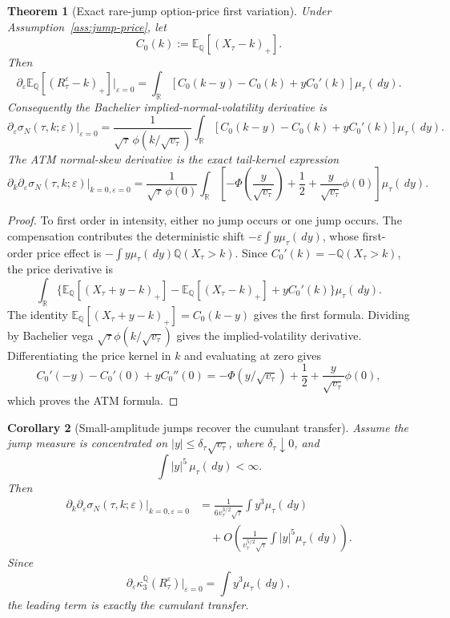 \documentclass[11pt,a4paper]{amsart}
\theoremstyle{plain}
\newtheorem{theorem}{Theorem}[section]
\newtheorem{corollary}[theorem]{Corollary}
\theoremstyle{definition}
\theoremstyle{remark}
\newcommand{\R}{\mathbb{R}}
\newcommand{\QQ}{\mathbb{Q}}
\newcommand{\EE}{\mathbb{E}}
\newcommand{\dd}{\,d}
\begin{document}
\begin{theorem}[Exact rare-jump option-price first variation]\label{thm:exact-jump-price}
Under Assumption~\ref{ass:jump-price}, let
\[
        C_0(k):=\EE_\QQ[(X_\tau-k)_+].
\]
Then
\[
        \partial_\varepsilon\EE_\QQ[(R_\tau^\varepsilon-k)_+]\big|_{\varepsilon=0}
        =
        \int_\R
        \left[
                C_0(k-y)-C_0(k)+yC_0'(k)
        \right]
        \mu_\tau(\dd y).
\]
Consequently the Bachelier implied-normal-volatility derivative is
\[
        \partial_\varepsilon\sigma_N(\tau,k;\varepsilon)\big|_{\varepsilon=0}
        =
        \frac{1}{\sqrt\tau\,\phi(k/\sqrt{v_\tau})}
        \int_\R
        \left[
                C_0(k-y)-C_0(k)+yC_0'(k)
        \right]
        \mu_\tau(\dd y).
\]
The ATM normal-skew derivative is the exact tail-kernel expression
\[
        \partial_k\partial_\varepsilon\sigma_N(\tau,k;\varepsilon)\big|_{k=0,\varepsilon=0}
        =
        \frac{1}{\sqrt\tau\,\phi(0)}
        \int_\R
        \left[
                -\Phi\!\left(\frac{y}{\sqrt{v_\tau}}\right)
                +\frac12
                +\frac{y}{\sqrt{v_\tau}}\phi(0)
        \right]
        \mu_\tau(\dd y).
\]
\end{theorem}

\begin{proof}
To first order in intensity, either no jump occurs or one jump occurs.  The compensation
contributes the deterministic shift \(-\varepsilon\int y\mu_\tau(\dd y)\), whose first-order price
effect is \(-\int y\mu_\tau(\dd y)\QQ(X_\tau>k)\).  Since
\(C_0'(k)=-\QQ(X_\tau>k)\), the price derivative is
\[
        \int_\R
        \{\EE_\QQ[(X_\tau+y-k)_+]-\EE_\QQ[(X_\tau-k)_+]+yC_0'(k)\}
        \mu_\tau(\dd y).
\]
The identity \(\EE_\QQ[(X_\tau+y-k)_+]=C_0(k-y)\) gives the first formula.  Dividing by Bachelier
vega \(\sqrt\tau\phi(k/\sqrt{v_\tau})\) gives the implied-volatility derivative.  Differentiating
the price kernel in \(k\) and evaluating at zero gives
\[
        C_0'(-y)-C_0'(0)+yC_0''(0)
        =
        -\Phi(y/\sqrt{v_\tau})+\frac12+\frac{y}{\sqrt{v_\tau}}\phi(0),
\]
which proves the ATM formula.
\end{proof}

\begin{corollary}[Small-amplitude jumps recover the cumulant transfer]\label{cor:small-jumps-cumulant}
Assume the jump measure is concentrated on \(|y|\le \delta_\tau\sqrt{v_\tau}\), where
\(\delta_\tau\downarrow0\), and
\[
        \int |y|^5\,\mu_\tau(\dd y)<\infty.
\]
Then
\[
\begin{aligned}
        \partial_k\partial_\varepsilon\sigma_N(\tau,k;\varepsilon)\big|_{k=0,\varepsilon=0}
        &=
        \frac{1}{6v_\tau^{3/2}\sqrt\tau}
        \int y^3\mu_\tau(\dd y)  \\
        &\quad+
        O\!\left(
                \frac{1}{v_\tau^{5/2}\sqrt\tau}
                \int |y|^5\mu_\tau(\dd y)
        \right).
\end{aligned}
\]
Since
\[
        \partial_\varepsilon\kappa_3^\QQ(R_\tau^\varepsilon)\big|_{\varepsilon=0}
        =
        \int y^3\mu_\tau(\dd y),
\]
the leading term is exactly the cumulant transfer.
\end{corollary}
\end{document}
